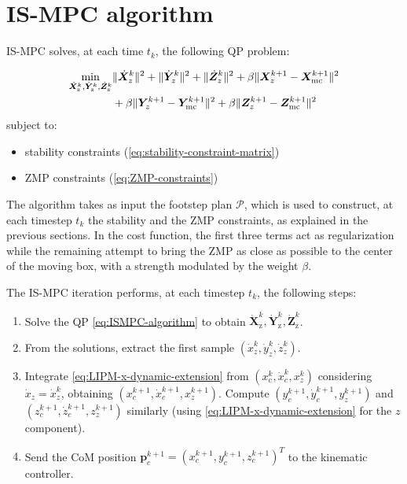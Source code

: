 \section{IS-MPC algorithm}
IS-MPC solves, at each time $t_k$, the following QP problem:
\begin{braced}
\begin{equation}
\begin{split}
\min_{\dot{\bm{X}}_\text{z}^k, \dot{\bm{Y}}_\text{z}^k, \dot{\bm{Z}}_\text{z}^k}
&\|\dot{\bm{X}}_z^k\|^2 + \|\dot{\bm{Y}}_z^k\|^2 + \|\dot{\bm{Z}}_z^k\|^2+\beta \|\bm{X}_z^{k+1} - {\bm{X}}_{\rm mc}^{k+1}\|^2 \\& + \beta \|\bm{Y}_z^{k+1} - {\bm{Y}}_{\rm mc}^{k+1}\|^2 + \beta \|\bm{Z}_z^{k+1} - {\bm{Z}}_{\rm mc}^{k+1}\|^2 \\
\end{split}
\label{eq:ISMPC-algorithm}
\end{equation}
\hspace{0.25cm} subject to:
\begin{itemize}
    \item stability constraints (\ref{eq:stability-constraint-matrix})
    \item ZMP constraints (\ref{eq:ZMP-constraints})
\end{itemize}
\end{braced}

The algorithm takes as input the footstep plan $\mathcal{P}$, which is used
to construct, at each timestep $t_k$ the stability and the ZMP constraints,
as explained in the previous sections.
In the cost function, the first three terms act as regularization while the
remaining attempt to bring the ZMP as close as possible to the center of the
moving box, with a strength modulated by the weight $\beta$.

The IS-MPC iteration performs, at each timestep $t_k$, the following steps:
\begin{enumerate}
    \item Solve the QP \eqref{eq:ISMPC-algorithm} to obtain 
        $\dot{\bm{X}}_\text{z}^k, \dot{\bm{Y}}_\text{z}^k, \dot{\bm{Z}}_\text{z}^k$.
    \item From the solutions, extract the first sample $(\dot x_z^k, \dot y_z^k, \dot z_z^k)$.
    \item Integrate \eqref{eq:LIPM-x-dynamic-extension} from
        $(x_c^k, \dot{x}_c^k, x_z^k)$ considering $\dot{x}_z=\dot{x}_z^k$, obtaining
        $(x_c^{k+1}, \dot{x}_c^{k+1}, x_z^{k+1})$.
        Compute $(y_c^{k+1}, \dot{y}_c^{k+1}, y_z^{k+1})$ and 
        $(z_c^{k+1}, \dot{z}_c^{k+1}, z_z^{k+1})$ similarly (using
        \eqref{eq:LIPM-x-dynamic-extension} for the $z$ component).
    \item Send the CoM position $\bm{p}_c^{k+1}=(x_c^{k+1}, y_c^{k+1}, z_c^{k+1})^T$
        to the kinematic controller.
\end{enumerate}

